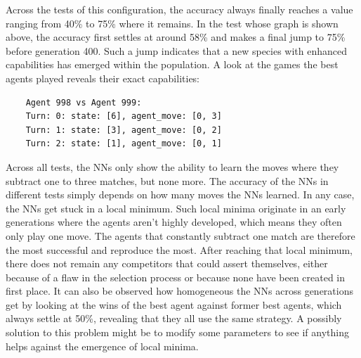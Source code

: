 \documentclass[11pt]{report}
\begin{document}
\begin{enumerate}
\begin{center}
        \begin{center}
        \end{center}
    \end{center}
    Across the tests of this configuration, the accuracy always finally reaches a value ranging from 40\% to 75\% where it remains.
    In the test whose graph is shown above, the accuracy first settles at around 58\% and makes a final jump to 75\% before generation 400.
    Such a jump indicates that a new species with enhanced capabilities has emerged within the population.
    A look at the games the best agents played reveals their exact capabilities:
    \begin{verbatim}
    Agent 998 vs Agent 999:
    Turn: 0: state: [6], agent_move: [0, 3]
    Turn: 1: state: [3], agent_move: [0, 2]
    Turn: 2: state: [1], agent_move: [0, 1]
    \end{verbatim}
    Across all tests, the NNs only show the ability to learn the moves where they subtract one to three matches, but none more.
    The accuracy of the NNs in different tests simply depends on how many moves the NNs learned.
    In any case, the NNs get stuck in a local minimum.
    Such local minima originate in an early generations where the agents aren't highly developed, which means they often only play one move.
    The agents that constantly subtract one match are therefore the most successful and reproduce the most.
    After reaching that local minimum, there does not remain any competitors that could assert themselves, either because of a flaw in the selection process or because none have been created in first place.
    It can also be observed how homogeneous the NNs across generations get by looking at the wins of the best agent against former best agents, which always settle at 50\%, revealing that they all use the same strategy.
    A possibly solution to this problem might be to modify some parameters to see if anything helps against the emergence of local minima.


\end{enumerate}
\end{document}
